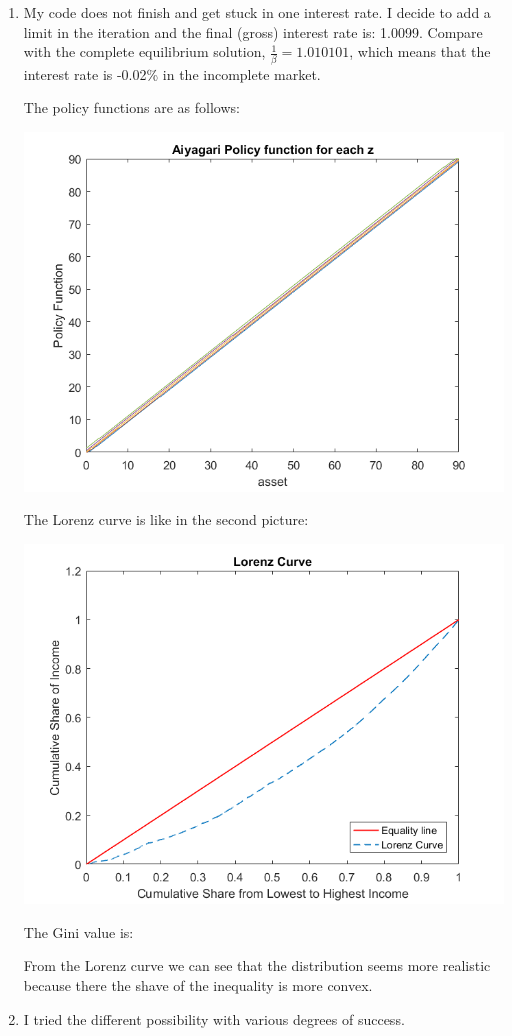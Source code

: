 \documentclass[12pt]{article}%
\begin{document}
\begin{enumerate}
	\item My code does not finish and get stuck in one interest rate. I decide to add a limit in the iteration and the final (gross) interest rate is: 1.0099. Compare with the complete equilibrium solution, $\frac{1}{\beta}=1.010101$, which means that the interest rate is -0.02\% in the incomplete market.
	
	The policy functions are as follows:
	
	\begin{center}
		\includegraphics[width=0.7\linewidth]{policy}
	\end{center}
	
	
	The Lorenz curve is like in the second picture:
	
	\begin{center}
		\includegraphics[width=0.7\linewidth]{Lorenz}
	\end{center}
	
	
	The Gini value is:
	
	
	From the Lorenz curve we can see that the distribution seems more realistic because there the shave of the inequality is more convex.
	
	\item I tried the different possibility with various degrees of success. 
	

\end{enumerate}
\end{document}
